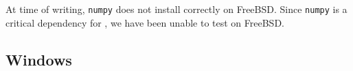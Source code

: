 \documentclass{esysdoc}
\begin{document}
At time of writing, \texttt{numpy} does not install correctly on FreeBSD.
Since \texttt{numpy} is a critical dependency for \escript, we have been unable to test on FreeBSD.

\begin{comment}
\subsubsection{Release 10.0}

Install the following packages:
\begin{itemize}
 \item python
 \item scons
 \item boost-python-libs
 \item bash
 \item hdf5
 \item silo
 \item py27-scipy
 \item py27-matplotlib
 \item py27-sympy
\end{itemize}

\noindent Next choose (or create) your options file.
For the setup as above the escript source comes with a prepared file in
\texttt{scons/templates/freebsd10.0_options.py}.
Finally to build escript issue the following in the escript source directory
(replace the options file as required):
\begin{shellCode}
scons -j4 options_file=scons/templates/freebsd10.0_options.py
\end{shellCode}

\emph{Note:} Some packages installed above are built with gcc 4.7. Somewhere
in the toolchain a system-installed gcc library is pulled in which is
incompatible with the one from version 4.7 and would prevent escript from
executing successfully. As explained in the FreeBSD
documentation\footnote{see \url{http://www.freebsd.org/doc/en/articles/custom-gcc/article.html}}
this can be fixed by adding a line to \texttt{/etc/libmap.conf}:
\begin{shellCode}
libgcc_s.so.1 gcc47/libgcc_s.so.1
\end{shellCode}

\end{comment}
\subsection{Windows}\label{sec:windowssrc}
\end{document}

